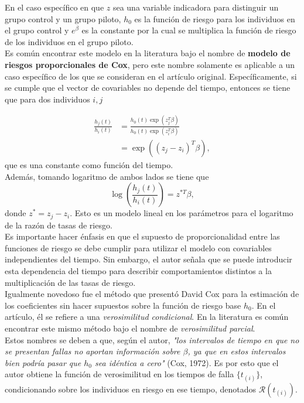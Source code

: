 \documentclass[11pt,a4paper]{article}
\begin{document}
En el caso específico en que $z$ sea una variable indicadora para distinguir un grupo control y un grupo piloto, $h_0$ es la función de riesgo para los individuos en el grupo control y $e^\beta$ es la constante por la cual se multiplica la función de riesgo de los individuos en el grupo piloto.\\

Es común encontrar este modelo en la literatura bajo el nombre de \textbf{modelo de riesgos proporcionales de Cox}, pero este nombre solamente es aplicable a un caso específico de los que se consideran en el artículo original. Específicamente, si se cumple que el vector de covariables no depende del tiempo, entonces se tiene que para dos individuos $i, j$

\begin{align}
\label{eq:prop_haz}
\frac{h_j(t)}{h_i(t)} &= \frac{h_0(t)\exp (z_j^T \beta)}{h_0(t)\exp (z_i^T \beta)} \nonumber \\
&= \exp ((z_j-z_i)^T \beta),
\end{align}
que es una constante como función del tiempo.\\

Además, tomando logaritmo de ambos lados se tiene que
$$\log \left(\frac{h_j(t)}{h_i(t)}\right) = z^{*T} \beta,$$ donde $z^* = z_j-z_i$. Esto es un modelo lineal en los parámetros para el logaritmo de la razón de tasas de riesgo.\\

Es importante hacer énfasis en que el supuesto de proporcionalidad entre las funciones de riesgo se debe cumplir para utilizar el modelo con covariables independientes del tiempo. Sin embargo, el autor señala  \citep{cox} que se puede introducir esta dependencia del tiempo para describir comportamientos distintos a la multiplicación de las tasas de riesgo.\\

Igualmente novedoso fue el método que presentó David Cox para la estimación de los coeficientes sin hacer supuestos sobre la función de riesgo base $h_0$. En el artículo, él se refiere a una \textit{verosimilitud condicional}. En la literatura es común encontrar este mismo método bajo el nombre de \textit{verosimilitud parcial}.\\

Estos nombres se deben a que, según el autor, \textit{"los intervalos de tiempo en que no se presentan fallas no aportan información sobre $\beta$, ya que en estos intervalos bien podría pasar que $h_0$ sea idéntica a cero"} (Cox, 1972). Es por esto que el autor obtiene la función de verosimilitud en los tiempos de falla $\lbrace t_{(i)} \rbrace$, condicionando sobre los individuos en riesgo en ese tiempo, denotados $\mathcal{R}(t_{(i)})$.\\
\end{document}
